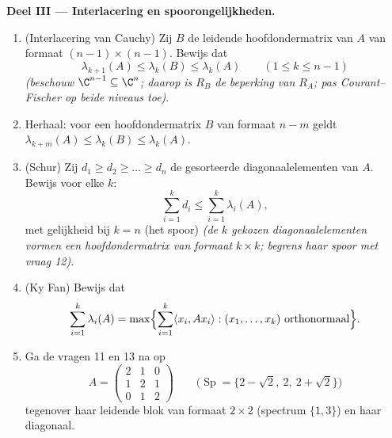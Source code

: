 \begin{problem}
\medskip
\noindent\textbf{Deel III --- Interlacering en
spoorongelijkheden.}
\begin{enumerate}[resume]
  \item (Interlacering van Cauchy) Zij $B$ de leidende
        hoofdondermatrix van $A$ van formaat $(n-1)\times(n-1)$.
        Bewijs dat
        \[
        \lambda_{k+1}(A) \leq \lambda_k(B) \leq \lambda_k(A)
        \qquad (1 \leq k \leq n-1)
        \]
        \emph{(beschouw $\C^{n-1} \subseteq \C^n$; daarop is
        $R_B$ de beperking van $R_A$; pas Courant--Fischer op
        beide niveaus toe)}.
  \item Herhaal: voor een hoofdondermatrix $B$ van formaat $n -
        m$ geldt $\lambda_{k+m}(A) \leq \lambda_k(B) \leq
        \lambda_k(A)$.
  \item (Schur) Zij $d_1 \geq d_2 \geq \dots \geq d_n$ de
        gesorteerde diagonaalelementen van $A$. Bewijs voor elke
        $k$:
        \[
        \sum_{i=1}^{k} d_i \leq \sum_{i=1}^{k}\lambda_i(A),
        \]
        met gelijkheid bij $k = n$ (het spoor)
        \emph{(de $k$ gekozen diagonaalelementen vormen een
        hoofdondermatrix van formaat $k\times k$; begrens haar
        spoor met vraag 12)}.
  \item (Ky Fan) Bewijs dat
        \[
        \sum_{i=1}^{k}\lambda_i(A)
        = \max\Bigl\{\sum_{i=1}^{k}\langle x_i, Ax_i\rangle
        : (x_1, \dots, x_k) \text{ orthonormaal}\Bigr\} .
        \]
  \item Ga de vragen 11 en 13 na op
        \[
        A = \begin{pmatrix} 2 & 1 & 0\\ 1 & 2 & 1\\
        0 & 1 & 2\end{pmatrix}
        \qquad
        \bigl(\operatorname{Sp} = \{2 - \sqrt2,\ 2,\
        2+\sqrt2\}\bigr)
        \]
        tegenover haar leidende blok van formaat $2\times2$
        (spectrum $\{1, 3\}$) en haar diagonaal.
\end{enumerate}


\end{problem}
